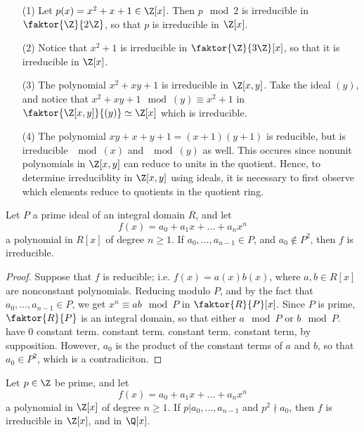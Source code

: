 \begin{example}\label{example_3.5}
    \begin{enumerate}
        \item[(1)] Let $p(x)=x^2+x+1 \in \Z[x]$. Then $p \mod{2}$ is irreducible
            in $\faktor{\Z}{2\Z}$, so that $p$ is irreducible in  $\Z[x]$.

        \item[(2)] Notice that $x^2+1$ is irreducible in  $\faktor{\Z}{3\Z}[x]$,
            so that it is irreducible in $\Z[x]$.

        \item[(3)] The polynomial $x^2+xy+1$ is irreducible in  $\Z[x,y]$. Take
            the ideal $(y)$, and notice that $x^2+xy+1 \mod{(y)} \equiv x^2+1$
            in $\faktor{\Z[x,y]}{(y)} \simeq \Z[x]$ which is irreducible.

        \item[(4)] The polynomial $xy+x+y+1=(x+1)(y+1)$ is reducible, but is
            irreducible $\mod{(x)}$ and $\mod{(y)}$ as well. This occures since
            nonunit polynomials in $\Z[x,y]$ can reduce to units in the
            quotient. Hence, to determine irreduciblity in $\Z[x,y]$ using
            ideals, it is necessary to first observe which elements reduce to
            quotients in the quotient ring.
    \end{enumerate}
\end{example}

\begin{theorem}\label{3.3.5}
    Let $P$ a prime ideal of an integral domain $R$, and let
    \begin{equation*}
        f(x)=a_0+a_1x+\dots+a_nx^n
    \end{equation*}
    a polynomial in $R[x]$ of degree $n \geq 1$. If $a_0, \dots, a_{n-1} \in
    P$, and $a_0 \notin P^2$, then $f$ is irreducible.
\end{theorem}
\begin{proof}
    Suppose that $f$ is reducible; i.e.  $f(x)=a(x)b(x)$, where $a,b \in R[x]$
    are nonconstant polynomials. Reducing modulo $P$, and by the fact that
    $a_0, \dots, a_{n-1} \in P$, we get $x^n \equiv ab \mod{P}$ in
    $\faktor{R}{P}[x]$. Since $P$ is prime,  $\faktor{R}{P}$ is an integral
    domain, so that either $a \mod{P}$ or $b \mod{P}$. have $0$ constant term.
    constant term. constant term. constant term, by supposition. However, $a_0$
    is the product of the constant terms of $a$ and $b$, so that $a_0 \in P^2$,
    which is a contradiciton.
\end{proof}
\begin{corollary}
    Let $p \in \Z$ be prime, and let
    \begin{equation*}
        f(x)=a_0+a_1x+\dots+a_nx^n
    \end{equation*}
    a polynomial in $\Z[x]$ of degree $n \geq 1$. If $p|a_0, \dots, a_{n-1}$ and
    $p^2 \nmid a_0$, then $f$ is irreducible in  $\Z[x]$, and in $\Q[x]$.
\end{corollary}


